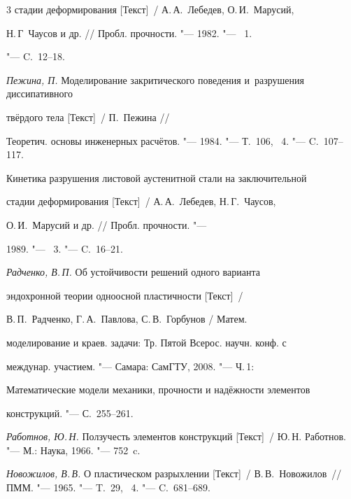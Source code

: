 \begin{thebibliography}{3}
стадии деформирования [Текст]~/ А.\,А.~Лебедев, О.\,И.~Марусий,

Н.\,Г~Чаусов и др. /\!/ Пробл. прочности. "--- 1982. "--- \No~1.

"--- C.~12--18.




\emph{Пежина, П.} Моделирование закритического поведения и~разрушения диссипативного 

твёрдого тела [Текст]~/ П.~Пежина /\!/

Теоретич. основы инженерных расчётов. "--- 1984. "--- Т.~106, \No~4. "--- C.~107--117.




Кинетика разрушения листовой аустенитной стали на заключительной

стадии деформирования [Текст]~/ А.\,А.~Лебедев, Н.\,Г.~Чаусов,

 О.\,И.~Марусий и др. /\!/ Пробл. прочности. "---

1989. "--- \No~3. "--- C.~16--21.




\emph{Радченко, В.\,П.} Об устойчивости решений одного варианта

эндохронной теории одноосной пластичности [Текст]~/

В.\,П.~Радченко, Г.\,А.~Павлова, С.\,В.~Горбунов / Матем.

моделирование и краев. задачи: Тр. Пятой Всерос. научн. конф. с

междунар. участием. "---  Самара: СамГТУ, 2008. "--- Ч.\,1:

Математические модели механики, прочности и надёжности элементов

конструкций. "---  С.~255--261.




\emph{Работнов, Ю.\,Н.} Ползучесть элементов конструкций [Текст]~/ Ю.\,Н. Работнов. "--- М.: Наука, 1966. "--- 752~c.




\emph{Новожилов, В.\,В.}  О пластическом разрыхлении [Текст]~/ В.\,В.~Новожилов~/\!/ ПММ. "--- 1965. "--- T.~29, \No~4. "--- C.~681--689.



\end{thebibliography}



\vspace{-10mm}



\makeengtitle



%

